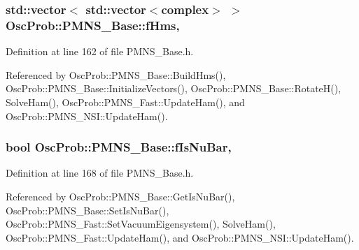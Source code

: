\subsubsection[{\texorpdfstring{f\+Hms}{fHms}}]{\setlength{\rightskip}{0pt plus 5cm}std\+::vector$<$ std\+::vector$<${\bf complex}$>$ $>$ Osc\+Prob\+::\+P\+M\+N\+S\+\_\+\+Base\+::f\+Hms\hspace{0.3cm}{\ttfamily [protected]}, {\ttfamily [inherited]}}\hypertarget{classOscProb_1_1PMNS__Base_adf5901166216e8c7a5cff2092952f473}{}\label{classOscProb_1_1PMNS__Base_adf5901166216e8c7a5cff2092952f473}


Definition at line 162 of file P\+M\+N\+S\+\_\+\+Base.\+h.



Referenced by Osc\+Prob\+::\+P\+M\+N\+S\+\_\+\+Base\+::\+Build\+Hms(), Osc\+Prob\+::\+P\+M\+N\+S\+\_\+\+Base\+::\+Initialize\+Vectors(), Osc\+Prob\+::\+P\+M\+N\+S\+\_\+\+Base\+::\+Rotate\+H(), Solve\+Ham(), Osc\+Prob\+::\+P\+M\+N\+S\+\_\+\+Fast\+::\+Update\+Ham(), and Osc\+Prob\+::\+P\+M\+N\+S\+\_\+\+N\+S\+I\+::\+Update\+Ham().

\subsubsection[{\texorpdfstring{f\+Is\+Nu\+Bar}{fIsNuBar}}]{\setlength{\rightskip}{0pt plus 5cm}bool Osc\+Prob\+::\+P\+M\+N\+S\+\_\+\+Base\+::f\+Is\+Nu\+Bar\hspace{0.3cm}{\ttfamily [protected]}, {\ttfamily [inherited]}}\hypertarget{classOscProb_1_1PMNS__Base_a0ebaeaefab36a3ff381c6293faedfdd6}{}\label{classOscProb_1_1PMNS__Base_a0ebaeaefab36a3ff381c6293faedfdd6}


Definition at line 168 of file P\+M\+N\+S\+\_\+\+Base.\+h.



Referenced by Osc\+Prob\+::\+P\+M\+N\+S\+\_\+\+Base\+::\+Get\+Is\+Nu\+Bar(), Osc\+Prob\+::\+P\+M\+N\+S\+\_\+\+Base\+::\+Set\+Is\+Nu\+Bar(), Osc\+Prob\+::\+P\+M\+N\+S\+\_\+\+Fast\+::\+Set\+Vacuum\+Eigensystem(), Solve\+Ham(), Osc\+Prob\+::\+P\+M\+N\+S\+\_\+\+Fast\+::\+Update\+Ham(), and Osc\+Prob\+::\+P\+M\+N\+S\+\_\+\+N\+S\+I\+::\+Update\+Ham().

